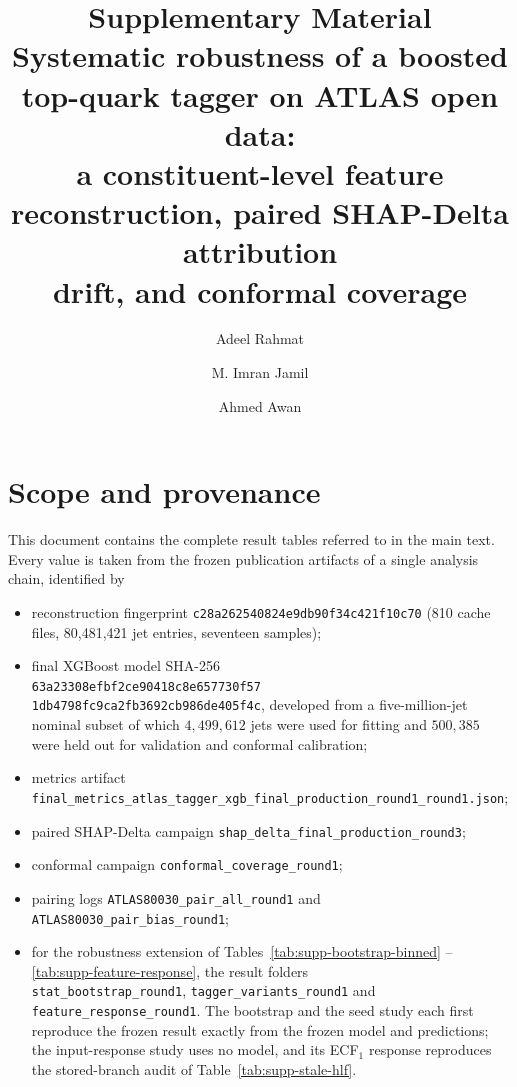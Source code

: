 \documentclass[11pt,a4paper,onecolumn]{article}
\title{Supplementary Material\\[4pt]
\large Systematic robustness of a boosted top-quark tagger on ATLAS open data:\\
a constituent-level feature reconstruction, paired SHAP-Delta attribution\\
drift, and conformal coverage}
\author{Adeel Rahmat \and M. Imran Jamil \and Ahmed Awan}
\date{}
\begin{document}
\maketitle

\section{Scope and provenance}

This document contains the complete result tables referred to in the main text.
Every value is taken from the frozen publication artifacts of a single analysis
chain, identified by

\begin{itemize}
  \item reconstruction fingerprint \texttt{c28a262540824e9db90f34c421f10c70}
        (810 cache files, 80{,}481{,}421 jet entries, seventeen samples);
  \item final XGBoost model SHA-256\\
        \texttt{63a23308efbf2ce90418c8e657730f57}\\
        \texttt{1db4798fc9ca2fb3692cb986de405f4c},
        developed from a five-million-jet nominal subset of which
        $4{,}499{,}612$ jets were used for fitting and $500{,}385$ were held out
        for validation and conformal calibration;
  \item metrics artifact
        \texttt{final\_metrics\_atlas\_tagger\_xgb\_final\_production\_round1\_round1.json};
  \item paired SHAP-Delta campaign \texttt{shap\_delta\_final\_production\_round3};
  \item conformal campaign \texttt{conformal\_coverage\_round1};
  \item pairing logs \texttt{ATLAS80030\_pair\_all\_round1} and
        \texttt{ATLAS80030\_pair\_bias\_round1};
  \item for the robustness extension of Tables~\ref{tab:supp-bootstrap-binned}%
        --\ref{tab:supp-feature-response}, the result folders\\
        \texttt{stat\_bootstrap\_round1}, \texttt{tagger\_variants\_round1} and
        \texttt{feature\_response\_round1}. The bootstrap and the seed study each
        first reproduce the frozen result exactly from the frozen model and
        predictions; the input-response study uses no model, and its ECF$_1$ response
        reproduces the stored-branch audit of Table~\ref{tab:supp-stale-hlf}.
\end{itemize}
\end{document}
